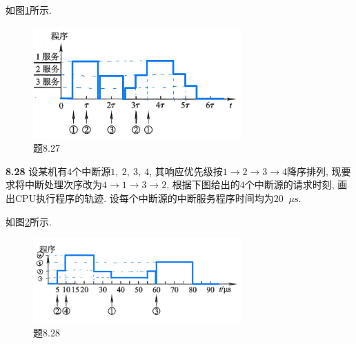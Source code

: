 \documentclass[UTF8]{report}
\newcommand{\mrm}[1]{\mathrm{#1}}
\newcommand{\problem}[1]{{\setlength{\parskip}{10pt}\noindent \bf{#1}}}
\newenvironment{solution}{{\noindent\hskip 2em \bf 解 \quad}}{}
\begin{document}
\begin{solution}
    如图\ref{fig:8_27}所示. 
    \begin{figure}[htbp]
        \centering
        \includegraphics[width=8cm]{fig/8.27.png}
        \caption{题8.27}
        \label{fig:8_27}
    \end{figure}
\end{solution}
    

\problem{8.28} 设某机有$4$个中断源$1,\ 2,\ 3,\ 4$, 其响应优先级按$1 \to 2 \to 3 \to 4$降序排列, 现要求将中断处理次序改为$4 \to 1 \to 3 \to 2$, 根据下图给出的$4$个中断源的请求时刻, 画出CPU执行程序的轨迹. 设每个中断源的中断服务程序时间均为$20 \mathop{}\!\mu \mrm s$.

\begin{solution}
    如图\ref{fig:8_28}所示. 
    \begin{figure}[htbp]
        \centering
        \includegraphics[width=8cm]{fig/8.28.png}
        \caption{题8.28}
        \label{fig:8_28}
    \end{figure}
\end{solution}
    
\end{document}
